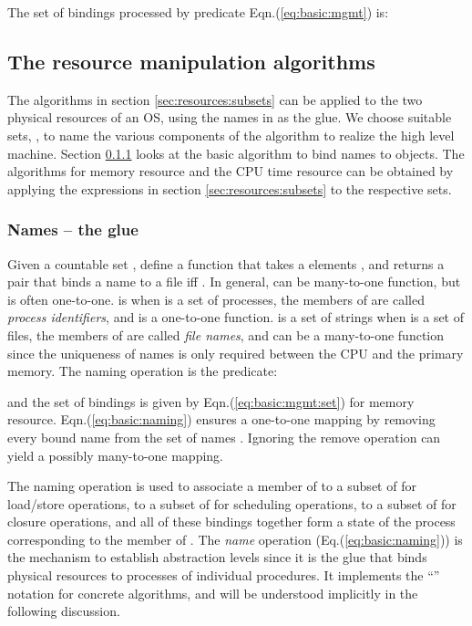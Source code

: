 \documentclass[draft]{article}
\def\eqn#1{Eqn.(\ref{#1})}
\begin{document}
The set of bindings processed by predicate \eqn{eq:basic:mgmt} is:


\subsection{The resource manipulation algorithms}
\label{sec:manage:algos}

The algorithms  in section \ref{sec:resources:subsets}  can be applied
to the two physical resources of an  OS, using the names in  as the
glue.  We choose suitable sets, , to name the various components of
the   algorithm  to   realize   the  high   level  machine.    Section
\ref{sec:basic:name:management} looks  at the basic  algorithm to bind
names to objects.  The algorithms for memory resource and the CPU time
resource  can  be obtained  by  applying  the  expressions in  section
\ref{sec:resources:subsets} to the respective sets.

\subsubsection{Names -- the glue}
\label{sec:basic:name:management}

Given a countable  set , define a function   that takes  a elements ,   and returns  a pair  that binds  a name  to a file  iff .  In  general,   can be  many-to-one function,  but is
often one-to-one.   is  when  is a set of processes,
the members of   are called \emph{process identifiers}, and 
is a one-to-one function.    is a set of strings when   is a set
of files, the members of  are called \emph{file names}, and 
can be  a many-to-one function since  the uniqueness of  names is only
required between the CPU and the primary memory.  The naming operation
is the predicate:

and the set of bindings is given by \eqn{eq:basic:mgmt:set} for memory
resource.
\eqn{eq:basic:naming} ensures  a one-to-one mapping  by removing every
bound name from  the set of names .   Ignoring the remove operation
can yield a possibly many-to-one mapping.

The naming operation is used to  associate a member of  to a subset
of   for load/store operations, to  a subset of   for scheduling
operations, to a subset of  for closure operations, and all of
these bindings together  form a state of the  process corresponding to
the     member     of      .      The     \emph{name}     operation
(Eq.(\ref{eq:basic:naming})) is the mechanism to establish abstraction
levels since it is the glue that binds physical resources to processes
of individual procedures.  It implements the ``'' notation for
concrete  algorithms,  and  will   be  understood  implicitly  in  the
following discussion.
\end{document}
